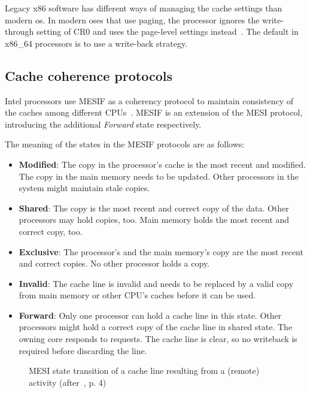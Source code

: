 Legacy x86 software has different ways of managing the cache settings than
modern \gls{os}. In modern \gls{os}es that use paging, the processor ignores the
write-through setting of CR0 and uses the page-level settings
instead~\cite{amd_manual}. The default in x86\_64 processors is to use a
write-back strategy.

\subsection{Cache coherence protocols}
\label{sec:state:technical:caches_protocol}
Intel processors
use MESIF as a coherency protocol to maintain consistency of the caches among
different CPUs~\cite{thomadakis2011architecture}.
MESIF is an extension of the MESI protocol, introducing the additional
\textit{Forward} state respectively.

The meaning of the states in the MESIF protocols are as follows:
\begin{itemize}
  \item \textbf{Modified}: The copy in the processor's cache is the most
    recent and modified. The copy in the main memory needs to be updated.
    Other processors in the system might maintain stale copies.
  \item \textbf{Shared}:  The copy is the most recent and correct copy of the
    data. Other processors may hold copies, too. Main memory holds the
    most recent and correct copy, too.
  \item \textbf{Exclusive}: The processor's and the main memory's copy are the
    most recent and correct copies. No other processor holds a copy.
  \item \textbf{Invalid}: The cache line is invalid and needs to be replaced by
    a valid copy from main memory or other CPU's caches before it can be used.
  \item \textbf{Forward}: Only one processor can hold a cache line in this
    state. Other processors might hold a correct copy of the cache line in
    shared state. The owning core responds to requests. The cache line is clear,
    so no writeback is required before discarding the line.
\end{itemize}

\begin{figure}
  \begin{center}
    
    \caption{MESI state transition of a cache line resulting from a (remote) activity (after~\cite{mckenney2010memory}, p. 4)}
    \label{fig:state:technical:mesi}
  \end{center}
\end{figure}

